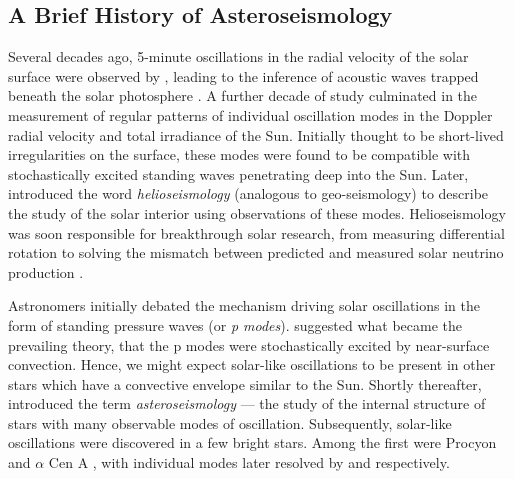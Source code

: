 
\subsection{A Brief History of Asteroseismology}

Several decades ago, 5-minute oscillations in the radial velocity of the solar surface were observed by \citet{Leighton.Noyes.ea1962}, leading to the inference of acoustic waves trapped beneath the solar photosphere \citep{Ulrich1970}. A further decade of study culminated in the measurement of regular patterns of individual oscillation modes in the Doppler radial velocity \citep{Claverie.Isaak.ea1979} and total irradiance \citep{Woodard.Hudson1983a} of the Sun. Initially thought to be short-lived irregularities on the surface, these modes were found to be compatible with stochastically excited standing waves penetrating deep into the Sun. Later, \citet{Deubner.Gough1984} introduced the word \emph{helioseismology} (analogous to geo-seismology) to describe the study of the solar interior using observations of these modes. Helioseismology was soon responsible for breakthrough solar research, from measuring differential rotation \citep{Deubner.Ulrich.ea1979} to solving the mismatch between predicted and measured solar neutrino production \citep{Bahcall.Ulrich1988}.

Astronomers initially debated the mechanism driving solar oscillations in the form of standing pressure waves (or \emph{p modes}). \citet{Goldreich.Keeley1977} suggested what became the prevailing theory, that the p modes were stochastically excited by near-surface convection. Hence, we might expect solar-like oscillations to be present in other stars which have a convective envelope similar to the Sun. Shortly thereafter, \citet{Christensen-Dalsgaard1984} introduced the term \emph{asteroseismology} --- the study of the internal structure of stars with many observable modes of oscillation. Subsequently, solar-like oscillations were discovered in a few bright stars. Among the first were Procyon and \(\alpha\) Cen A \citep{Gelly.Grec.ea1986}, with individual modes later resolved by \citet{Martic.Schmitt.ea1999} and \citet{Bouchy.Carrier2001} respectively.

